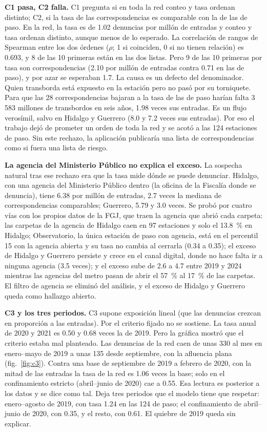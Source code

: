 \documentclass[conference]{IEEEtran}
\newcommand{\pme}{por millón de entradas}
\begin{document}
\textbf{C1 pasa, C2 falla.} C1 pregunta si en toda la red conteo y tasa ordenan distinto; C2, si la tasa de las correspondencias es comparable con la de las de paso. En la red, la tasa es de 1.02 denuncias \pme{} y conteo y tasa ordenan distinto, aunque menos de lo esperado. La correlación de rangos de Spearman entre los dos órdenes ($\rho$; 1 si coinciden, 0 si no tienen relación) es 0.693, y 8 de las 10 primeras están en las dos listas. Pero 9 de las 10 primeras por tasa son correspondencias (2.10 \pme{} contra 0.71 en las de paso), y por azar se esperaban 1.7. La causa es un defecto del denominador. Quien transborda está expuesto en la estación pero no pasó por su torniquete. Para que las 28 correspondencias bajaran a la tasa de las de paso harían falta 3\,583 millones de transbordos en seis años, 1.98 veces sus entradas. Es un flujo verosímil, salvo en Hidalgo y Guerrero (8.0 y 7.2 veces sus entradas). Por eso el trabajo dejó de prometer un orden de toda la red y se acotó a las 124 estaciones de paso. Sin este rechazo, la aplicación publicaría una lista de correspondencias como si fuera una lista de riesgo.

\textbf{La agencia del Ministerio Público no explica el exceso.} La sospecha natural tras ese rechazo era que la tasa mide dónde se puede denunciar. Hidalgo, con una agencia del Ministerio Público dentro (la oficina de la Fiscalía donde se denuncia), tiene 6.38 \pme{}, 2.7 veces la mediana de correspondencias comparables; Guerrero, 5.79 y 3.0 veces. Se probó por cuatro vías con los propios datos de la FGJ, que traen la agencia que abrió cada carpeta: las carpetas de la agencia de Hidalgo caen en 97 estaciones y solo el 13.8~\% en Hidalgo; Observatorio, la única estación de paso con agencia, está en el percentil 15 con la agencia abierta y su tasa no cambia al cerrarla (0.34 a 0.35); el exceso de Hidalgo y Guerrero persiste y crece en el canal digital, donde no hace falta ir a ninguna agencia (3.5 veces); y el exceso sube de 2.6 a 4.7 entre 2019 y 2024 mientras las agencias del metro pasan de abrir el 57~\% al 17~\% de las carpetas. El filtro de agencia se eliminó del análisis, y el exceso de Hidalgo y Guerrero queda como hallazgo abierto.

\textbf{C3 y los tres periodos.} C3 supone exposición lineal (que las denuncias crezcan en proporción a las entradas). Por el criterio fijado no se sostiene. La tasa anual de 2020 y 2021 es 0.50 y 0.68 veces la de 2019. Pero la gráfica mostró que el criterio estaba mal planteado. Las denuncias de la red caen de unas 330 al mes en enero--mayo de 2019 a unas 135 desde septiembre, con la afluencia plana (fig.~\ref{fig:c3}). Contra una base de septiembre de 2019 a febrero de 2020, con la mitad de las entradas la tasa de la red es 1.06 veces la base; solo en el confinamiento estricto (abril--junio de 2020) cae a 0.55. Esa lectura es posterior a los datos y se dice como tal. Deja tres periodos que el modelo tiene que respetar: enero--agosto de 2019, con tasa 1.24 en las 124 de paso; el confinamiento de abril--junio de 2020, con 0.35, y el resto, con 0.61. El quiebre de 2019 queda sin explicar.
\end{document}
